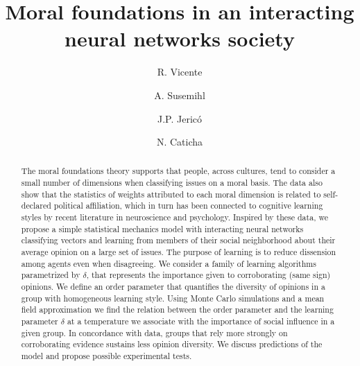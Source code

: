 \documentclass[twocolumn,showpacs]{revtex4-1}
\begin{document}
\title[Moral foundations and interacting neural networks]{Moral foundations in an interacting neural networks society}

\author{R. Vicente}


\author{A. Susemihl}

\author{J.P. Jeric\'o}
\author{N. Caticha}

\begin{abstract}
The moral foundations theory supports that people, across cultures, tend  to consider a small number of dimensions when
classifying issues on a moral basis. The data also show that the statistics of weights attributed 
to each moral dimension is related to self-declared political affiliation, which in turn  has been connected to cognitive learning styles by
 recent literature in neuroscience and psychology.   Inspired by these data,  we propose a simple statistical mechanics model with
interacting neural networks classifying vectors and  learning from  members of their social neighborhood
 about their average opinion on a large set of issues. The purpose of learning is to reduce dissension among agents even when disagreeing.
We consider a family of learning algorithms parametrized by $\delta$, that represents the  importance given to corroborating (same sign) opinions. We define 
an order parameter   that quantifies the diversity of opinions in a group with homogeneous learning style. Using Monte Carlo simulations and 
a mean field approximation we find the relation between the order parameter and the learning parameter  $\delta$ at a temperature we 
associate with the importance of social influence in a given group. In concordance with data, groups that rely more strongly on corroborating 
evidence sustains less opinion diversity. We discuss predictions of the model and propose possible experimental tests. 
\end{abstract}

\maketitle
\end{document}

